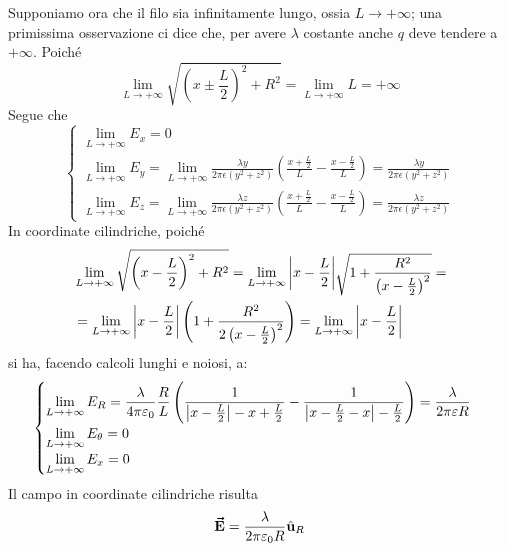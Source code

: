 	Supponiamo ora che il filo sia infinitamente lungo, ossia $L\to+\infty$; una primissima osservazione ci dice che, per avere $\lambda$ costante anche $q$ deve tendere a $+\infty$.
	Poiché
	\begin{equation*}
		\lim_{L\to+\infty}\sqrt{\left(x\pm\frac{L}{2}\right)^2+R^2}=\lim_{L\to+\infty}L=+\infty
	\end{equation*}
	Segue che
	\begin{equation*}\displaystyle
		\begin{cases}
			\displaystyle\lim_{L\to+\infty}E_x=0\\
			\displaystyle\lim_{L\to+\infty}E_y=\lim_{L\to+\infty}\frac{\lambda y}{2\pi\epsilon\left(y^2+z^2\right)}\left(\frac{x+\frac{L}{2}}{L}-\frac{x-\frac{L}{2}}{L}\right)=\frac{\lambda y}{2\pi\epsilon\left(y^2+z^2\right)}\\
			\displaystyle\lim_{L\to+\infty}E_z=\lim_{L\to+\infty}\frac{\lambda z}{2\pi\epsilon\left(y^2+z^2\right)}\left(\frac{x+\frac{L}{2}}{L}-\frac{x-\frac{L}{2}}{L}\right)=\frac{\lambda z}{2\pi\epsilon\left(y^2+z^2\right)}
		\end{cases}
	\end{equation*}
In coordinate cilindriche, poiché
\begin{align*}
	&\lim_{L\to+\infty}\sqrt{\left(x-\frac{L}{2}\right)^2+R^2}=\lim_{L\to+\infty}\abs{x-\frac{L}{2}}\sqrt{1+\frac{R^2}{\left(x-\frac{L}{2}\right)^2}}=\\
	&=\lim_{L\to+\infty}\abs{x-\frac{L}{2}}\left(1+\frac{R^2}{2\left(x-\frac{L}{2}\right)^2}\right)=\lim_{L\to+\infty}\abs{x-\frac{L}{2}}
\end{align*}
si ha, facendo calcoli lunghi e noiosi, a:
\begin{equation*}
	\begin{cases}
		\displaystyle\lim_{L\to+\infty}E_R=\frac{\lambda}{4\pi\varepsilon_0}\frac{R}{L}\left(\frac{1}{\abs{x-\frac{L}{2}}-x+\frac{L}{2}}-\frac{1}{\abs{x-\frac{L}{2}-x}-\frac{L}{2}}\right)=\frac{\lambda}{2\pi\varepsilon R}\\
		\displaystyle\lim_{L\to+\infty}E_\theta=0\\
		\displaystyle\lim_{L\to+\infty}E_x=0
	\end{cases}
\end{equation*}
Il campo in coordinate cilindriche risulta
	\begin{equation}
		\vb*{\va{E}}=\frac{\lambda}{2\pi\varepsilon_0R}\hat{\mathbf{u}}_R
	\end{equation}
